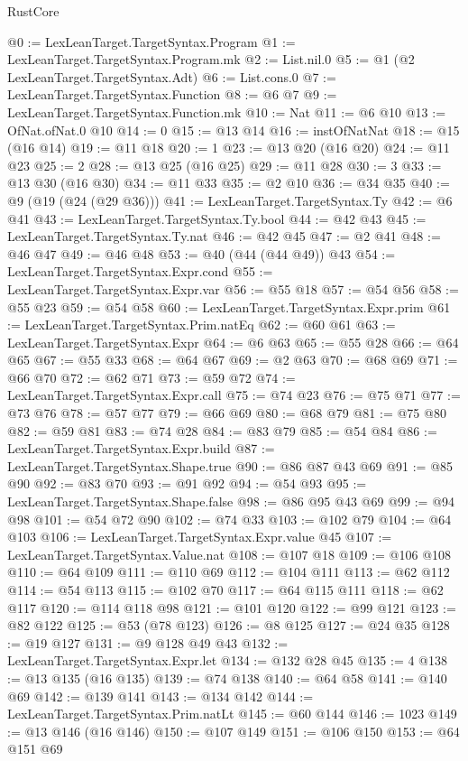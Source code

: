 \begin{lexlean}{RustCore}
\begin{coremodule}
@0 := LexLeanTarget.TargetSyntax.Program
@1 := LexLeanTarget.TargetSyntax.Program.mk
@2 := List.nil.{0}
@5 := @1 (@2 LexLeanTarget.TargetSyntax.Adt)
@6 := List.cons.{0}
@7 := LexLeanTarget.TargetSyntax.Function
@8 := @6 @7
@9 := LexLeanTarget.TargetSyntax.Function.mk
@10 := Nat
@11 := @6 @10
@13 := OfNat.ofNat.{0} @10
@14 := 0
@15 := @13 @14
@16 := instOfNatNat
@18 := @15 (@16 @14)
@19 := @11 @18
@20 := 1
@23 := @13 @20 (@16 @20)
@24 := @11 @23
@25 := 2
@28 := @13 @25 (@16 @25)
@29 := @11 @28
@30 := 3
@33 := @13 @30 (@16 @30)
@34 := @11 @33
@35 := @2 @10
@36 := @34 @35
@40 := @9 (@19 (@24 (@29 @36)))
@41 := LexLeanTarget.TargetSyntax.Ty
@42 := @6 @41
@43 := LexLeanTarget.TargetSyntax.Ty.bool
@44 := @42 @43
@45 := LexLeanTarget.TargetSyntax.Ty.nat
@46 := @42 @45
@47 := @2 @41
@48 := @46 @47
@49 := @46 @48
@53 := @40 (@44 (@44 @49)) @43
@54 := LexLeanTarget.TargetSyntax.Expr.cond
@55 := LexLeanTarget.TargetSyntax.Expr.var
@56 := @55 @18
@57 := @54 @56
@58 := @55 @23
@59 := @54 @58
@60 := LexLeanTarget.TargetSyntax.Expr.prim
@61 := LexLeanTarget.TargetSyntax.Prim.natEq
@62 := @60 @61
@63 := LexLeanTarget.TargetSyntax.Expr
@64 := @6 @63
@65 := @55 @28
@66 := @64 @65
@67 := @55 @33
@68 := @64 @67
@69 := @2 @63
@70 := @68 @69
@71 := @66 @70
@72 := @62 @71
@73 := @59 @72
@74 := LexLeanTarget.TargetSyntax.Expr.call
@75 := @74 @23
@76 := @75 @71
@77 := @73 @76
@78 := @57 @77
@79 := @66 @69
@80 := @68 @79
@81 := @75 @80
@82 := @59 @81
@83 := @74 @28
@84 := @83 @79
@85 := @54 @84
@86 := LexLeanTarget.TargetSyntax.Expr.build
@87 := LexLeanTarget.TargetSyntax.Shape.true
@90 := @86 @87 @43 @69
@91 := @85 @90
@92 := @83 @70
@93 := @91 @92
@94 := @54 @93
@95 := LexLeanTarget.TargetSyntax.Shape.false
@98 := @86 @95 @43 @69
@99 := @94 @98
@101 := @54 @72 @90
@102 := @74 @33
@103 := @102 @79
@104 := @64 @103
@106 := LexLeanTarget.TargetSyntax.Expr.value @45
@107 := LexLeanTarget.TargetSyntax.Value.nat
@108 := @107 @18
@109 := @106 @108
@110 := @64 @109
@111 := @110 @69
@112 := @104 @111
@113 := @62 @112
@114 := @54 @113
@115 := @102 @70
@117 := @64 @115 @111
@118 := @62 @117
@120 := @114 @118 @98
@121 := @101 @120
@122 := @99 @121
@123 := @82 @122
@125 := @53 (@78 @123)
@126 := @8 @125
@127 := @24 @35
@128 := @19 @127
@131 := @9 @128 @49 @43
@132 := LexLeanTarget.TargetSyntax.Expr.let
@134 := @132 @28 @45
@135 := 4
@138 := @13 @135 (@16 @135)
@139 := @74 @138
@140 := @64 @58
@141 := @140 @69
@142 := @139 @141
@143 := @134 @142
@144 := LexLeanTarget.TargetSyntax.Prim.natLt
@145 := @60 @144
@146 := 1023
@149 := @13 @146 (@16 @146)
@150 := @107 @149
@151 := @106 @150
@153 := @64 @151 @69

\end{coremodule}
\end{lexlean}
